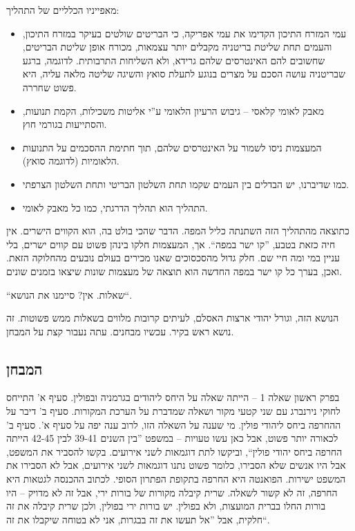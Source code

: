 \documentclass[]{../../../../tex/classes/styledArticle}
\begin{document}
	מאפייניו הכלליים של התהליך: 
	\begin{itemize}
		\item עמי המזרח התיכון הקדימו את עמי אפריקה, כי הבריטים שולטים בעיקר במזרח התיכון, והעמים תחת שליטת בריטניה מקבלים יותר עצמאות, מכורח אופן שליטת הבריטים, שחשובים להם האינטרסים שלהם גרידא, ולא השליחות התרבותית. לדוגמה, ברגע שבריטניה עושה הסכם על מצרים בנוגע לתעלת סואץ והשיגה שליטה מלאה עליה, היא פשוט שחררה. 
		\item מאבק לאומי קלאסי – גיבוש הרעיון הלאומי ע''י אליטות משכילות, הקמת תנועות, והסתייעות בגורמי חוץ. 
		\item המעצמות ניסו לשמור על האינטרסים שלהם, תוך חתימת ההסכמים על התנועות הלאומיות (לדוגמה סואץ). 
		\item כמו שדיברנו, יש הבדלים בין העמים שקמו תחת השלטון הבריטי ותחת השלטון הצרפתי. 
		\item התהליך הוא תהליך הדרגתי, כמו כל מאבק לאומי. 
	\end{itemize}
	
	כתוצאה מהתהליך הזה השתנתה כליל המפה. הדבר שהכי בולט בה, הוא הקווים הישרים. אין חיה כזאת בטבע, ''קו ישר במפה``. אך, המעצמות חלקו בינהן פשוט עם קווים ישרים, בלי עניין במי ומה חיי שם. חלק גדול מהסכסוכים שאנו מכירים בעולם נובעים מהחלוקה הזאת. ואכן, בערך כל קו ישר במפה החדשה הוא תוצאה של מעצמות שונות שיצאו בזמנים שונים. 
	
	``שאלות. אין? סיימנו את הנושא``. 
	
	הנושא הזה, וגורל יהודי ארצות האסלם, לעיתים קרובות מלווים בשאלות ממש פשוטות. זה נושא ראש בקיר. עכשיו מבחנים. עתה נעבור קצת על המבחן. 
	
	\subsection*{המבחן}
	בפרק ראשון שאלה 1 – הייתה שאלה על היחס ליהודים בגרמניה ובפולין. סעיף א' התייחס לחוקי נירנברג עם שני קטעי מקור ושאלה שמדברת על הערכת המקורות. סעיף ב' דיבר על ההחרפה ביחס ליהודי פולין. מי שענה על השאלה הזו, לרוב ענה יפה על סעיף א'. סעיף ב' לכאורה יותר פשוט, אבל כאן עשו טעויות – במשפט ''בין השנים 39-41 לבין 42-45 הייתה החרפה ביחס יהודי פולין``, וביקשו לתת דוגמאות לשני אירועים. בקשו להסביר את המשפט, אבל היו אנשים שלא הסבירו, כלומר פשוט נתנו דוגמאות לשני אירועים, אבל לא הסבירו את המשפט ישירות. הפואנטה היא החרפה בתקופת הפתרון הסופי. לכתוב ההכנסה לגטאות היא החרפה, זה לא קשור לשאלה. שרית קיבלה מקורות של בורות ירי, אבל זה לא מדויק – היו בורות החלו בברית המועצות, ולא בפולין. יש בורות ירי בפולין, ולכן שרית קיבלה את זה חלקית, אבל ''אל תעשו את זה בבגרות, אני לא בטוחה שיקבלו את זה``. 
	
\end{document}
